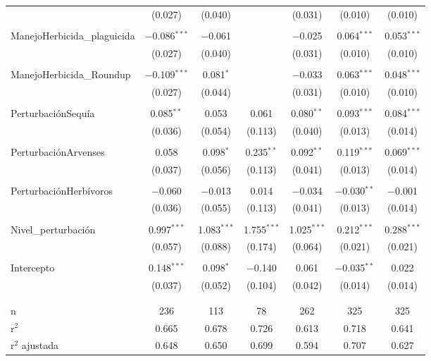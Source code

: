 \documentclass[spanish,11pt]{article}
\begin{document}
\begin{table}[!htbp]
\begin{tabular}{@{\extracolsep{5pt}}lcccccc}
  & (0.027) & (0.040) &  & (0.031) & (0.010) & (0.010) \\ 
  & & & & & & \\ 
 ManejoHerbicida\_plaguicida & $-$0.086$^{***}$ & $-$0.061 &  & $-$0.025 & 0.064$^{***}$ & 0.053$^{***}$ \\ 
  & (0.027) & (0.040) &  & (0.031) & (0.010) & (0.010) \\ 
  & & & & & & \\ 
 ManejoHerbicida\_Roundup & $-$0.109$^{***}$ & 0.081$^{*}$ &  & $-$0.033 & 0.063$^{***}$ & 0.048$^{***}$ \\ 
  & (0.027) & (0.044) &  & (0.031) & (0.010) & (0.010) \\ 
  & & & & & & \\ 
 PerturbaciónSequía & 0.085$^{**}$ & 0.053 & 0.061 & 0.080$^{**}$ & 0.093$^{***}$ & 0.084$^{***}$ \\ 
  & (0.036) & (0.054) & (0.113) & (0.040) & (0.013) & (0.014) \\ 
  & & & & & & \\ 
 PerturbaciónArvenses & 0.058 & 0.098$^{*}$ & 0.235$^{**}$ & 0.092$^{**}$ & 0.119$^{***}$ & 0.069$^{***}$ \\ 
  & (0.037) & (0.056) & (0.113) & (0.041) & (0.013) & (0.014) \\ 
  & & & & & & \\ 
 PerturbaciónHerbívoros & $-$0.060 & $-$0.013 & 0.014 & $-$0.034 & $-$0.030$^{**}$ & $-$0.001 \\ 
  & (0.036) & (0.055) & (0.113) & (0.041) & (0.013) & (0.014) \\ 
  & & & & & & \\ 
 Nivel\_perturbación & 0.997$^{***}$ & 1.083$^{***}$ & 1.755$^{***}$ & 1.025$^{***}$ & 0.212$^{***}$ & 0.288$^{***}$ \\ 
  & (0.057) & (0.088) & (0.174) & (0.064) & (0.021) & (0.021) \\ 
  & & & & & & \\ 
 Intercepto & 0.148$^{***}$ & 0.098$^{*}$ & $-$0.140 & 0.061 & $-$0.035$^{**}$ & 0.022 \\ 
  & (0.037) & (0.052) & (0.104) & (0.042) & (0.014) & (0.014) \\ 
  & & & & & & \\ 
\hline \\[-1.8ex] 
n & 236 & 113 & 78 & 262 & 325 & 325 \\ 
r$^{2}$ & 0.665 & 0.678 & 0.726 & 0.613 & 0.718 & 0.641 \\ 
r$^{2}$ ajustada & 0.648 & 0.650 & 0.699 & 0.594 & 0.707 & 0.627 \\ 

\end{tabular}
\end{table}
\end{document}
